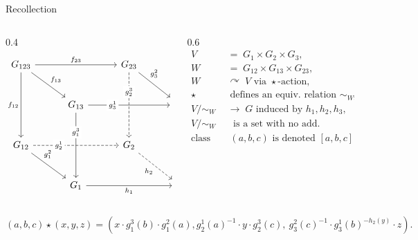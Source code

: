 \documentclass{beamer} %
\theoremstyle{definition}
\begin{document}
\begin{frame}[fragile]{Recollection}
\begin{columns}[T]
\begin{column}{0.4\textwidth}
\raggedleft
\scriptsize
\hspace*{0pt}%
\[
\begin{tikzcd}[row sep=2.6em, column sep=3em]
G_{123}
  \arrow[rr, "f_{23}"]
  \arrow[dd, "f_{12}"']
  \arrow[rd, "f_{13}"]
&&
G_{23}
  \arrow[dd, dashed, "{g_2^3}" description, pos=0.3]
  \arrow[rd, "{g_3^2}", pos=0.3]
& \\
&
G_{13}
  \arrow[rr, "{g_3^1}" description, pos=0.3]
  \arrow[dd, "{g_1^3}" description, pos=0.3]
&&
G_3
  \arrow[dd, "h_3"]
\\
G_{12}
  \arrow[rr, dashed, "{g_2^1}" description, pos=0.3]
  \arrow[rd, "{g_1^2}", pos=0.3]
&&
G_2
  \arrow[rd, dashed, "h_2"']
& \\
&
G_1
  \arrow[rr, "h_1"']
&&
G
\end{tikzcd}
\]
\end{column}

\begin{column}{0.6\textwidth}
\raggedleft
\scriptsize
\[
\begin{aligned}
V \;&=\; G_1 \times G_2 \times G_3,\\
W \;&=\; G_{12} \times G_{13} \times G_{23},\\
W \;&\curvearrowright \; V\text{ via }\star\text{-action},\\
\star \;&\; \text{defines an equiv. relation $\sim_W$},\\
V/\sim_W\; &\rightarrow \; G\text{ induced by }h_1, h_2, h_3,\\
V/\sim_W\;&\;\text{ is a set with no add. structure, }\\
\text{class of} \;&\;(a, b, c)\text{ is denoted }[a, b, c].\\
\end{aligned}
\]
\end{column}
\end{columns}

\scriptsize { \[(a, b, c) \star (x, y, z) = (x \cdot g_1^3(b) \cdot g_1^2(a), g_2^1(a)^{-1} \cdot y \cdot g_2^3(c),\ g_3^2(c)^{-1} \cdot g_3^1(b)^{-h_2(y)} \cdot z).\] }


\end{frame}
\end{document}
